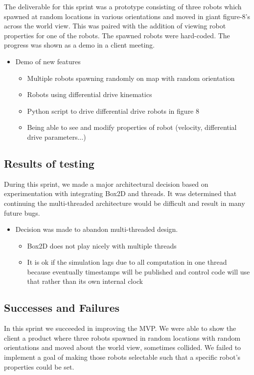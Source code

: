 The deliverable for this sprint was a prototype consisting of three robots which spawned at random locations in various orientations and moved in giant figure-8's across the world view. This was paired with the addition of viewing robot properties for one of the robots. The spawned robots were hard-coded. The progress was shown as a demo in a client meeting.

\begin{itemize}
	\item Demo of new features
	\begin{itemize}
		\item Multiple robots spawning randomly on map with random orientation
		\item Robots using differential drive kinematics
		\item Python script to drive differential drive robots in figure 8
		\item Being able to see and modify properties of robot (velocity, differential drive parameters...)
	\end{itemize}
\end{itemize}

\subsection{Results of testing}
During this sprint, we made a major architectural decision based on experimentation with integrating Box2D and threads. It was determined that continuing the multi-threaded architecture would be difficult and result in many future bugs. 

\begin{itemize}
	\item Decision was made to abandon multi-threaded design.
	\begin{itemize}
		\item Box2D does not play nicely with multiple threads
		\item It is ok if the simulation lags due to all computation in one thread because eventually timestamps will be published and control code will use that rather than its own internal clock
	\end{itemize}
\end{itemize}

\subsection{Successes and Failures}

In this sprint we succeeded in improving the MVP. We were able to show the client a product where three robots spawned in random locations with random orientations and moved about the world view, sometimes collided. We failed to implement a goal of making those robots selectable such that a specific robot's properties could be set.

